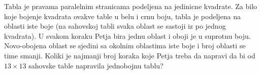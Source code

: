 \problem
Tabla je pravama paralelnim stranicama podeljena na jedinicne kvadrate.
Za bilo koje bojenje kvadrata ovakve table u belu i crnu boju, tabla je podeljena na oblasti iste boje (na sahovskoj tabli svaka oblast se sastoji iz po jednog kvadrata).
U svakom koraku Petja bira jednu oblast i oboji je u suprotnu boju.
Novo-obojena oblast se sjedini sa okolnim oblastima iste boje i broj oblasti se time smanji.
Koliki je najmanji broj koraka koje Petja treba da napravi da bi od $13 \times 13$ sahovske table napravila jednobojnu tablu?
\solution
\endproblem
